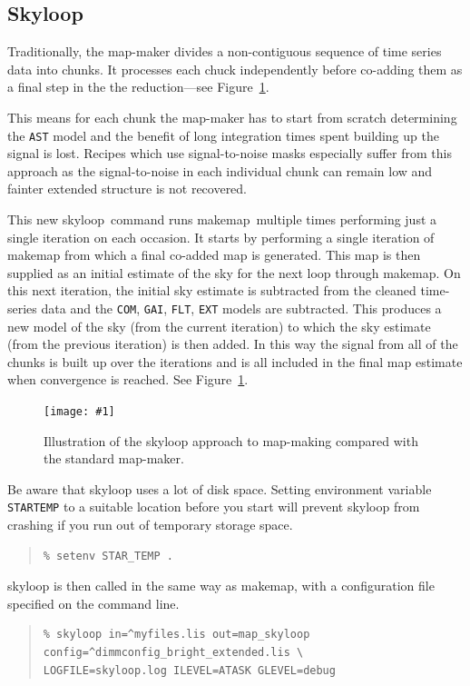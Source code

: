 \documentclass[twoside,11pt]{article}
\newcommand{\htmladdimg}[1]{}
\newcommand{\htmlref}[2]{#1}
\newcommand{\latexhtml}[2]{#1}
\newcommand{\xref}[3]{#1}
\newcommand{\xlabel}[1]{}
\renewcommand{\_}{\texttt{\symbol{95}}}
\newenvironment{myquote}{
   \color{MidnightBlue}\begin{quote}\begin{small}}{
   \end{small}\end{quote}
}
\newcommand{\task}[1]{\textsf{#1}}
\newcommand{\envvar}[1]{\texttt{#1}}
\newcommand{\model}[1]{\texttt{#1}}
\newcommand{\makemap}{\xref{\task{makemap}}{sun258}{MAKEMAP}}
\newcommand{\skyloop}{\xref{\task{skyloop}}{sun258}{SKYLOOP}}
\newcommand{\myfig}[6]{
  \begin{figure}#2
    \centering\texttt{[image: \#1]}
    \typeout{#1 inserted on page \arabic{page}}
    \caption[#5]{\label{#4}\small #6}
  \end{figure}
}
\newcommand{\myfig}[6]{
    \label{#4} \htmladdimg{#1.png}\\
    \\
    Figure: #6\\
  }
\newcommand{\cref}[3]{\latexhtml{#1~\ref{#2}}{\htmlref{#3}{#2}}}
\renewenvironment{myquote}{
      \begin{quote}\begin{small}}{
      \end{small}\end{quote}
   }
\begin{document}
\subsection{\xlabel{skyloop}Skyloop}
\label{sec:skyloop}

Traditionally, the map-maker divides a non-contiguous sequence of time
series data into chunks. It processes each chuck independently
before co-adding them as a final step in the the reduction---see
\cref{Figure}{fig:skyloop}{the figure below}.

This means for each chunk the map-maker has to start from scratch
determining the \model{AST} model and the benefit of long integration
times spent building up the signal is lost. Recipes which use
signal-to-noise masks especially suffer from this approach as the
signal-to-noise in each individual chunk can remain low and fainter
extended structure is not recovered.

This new \skyloop\ command runs \makemap\ multiple times
performing just a single iteration on each occasion. It starts by
performing a single iteration of \task{makemap} from which a final
co-added map is generated. This map is then supplied as an initial
estimate of the sky for the next loop through \task{makemap}. On
this next iteration, the initial sky estimate is subtracted from the
cleaned time-series data and the \model{COM}, \model{GAI},
\model{FLT}, \model{EXT} models are subtracted. This produces a new
model of the sky (from the current iteration) to which the sky
estimate (from the previous iteration) is then added. In this way the
signal from all of the chunks is built up over the iterations and is
all included in the final map estimate when convergence is reached.
See \cref{Figure}{fig:skyloop}{the diagram below}.


\myfig{sc21_skyloop}{[h!]}{width=0.55\linewidth}{fig:skyloop}{
  Illustration of the \task{skyloop} approach}{
  Illustration of the \task{skyloop} approach
  to map-making compared with the standard map-maker.
}

Be aware that \task{skyloop} uses a lot of disk space. Setting
environment variable \envvar{STAR\_TEMP} to a suitable location
before you start will prevent \task{skyloop} from crashing
if you run out of temporary storage space.
\begin{myquote}
\begin{verbatim}
% setenv STAR_TEMP .
\end{verbatim}
\end{myquote}
\task{skyloop} is then called in the same way as \makemap, with
 a configuration file specified on the command line.
\begin{myquote}
\begin{verbatim}
% skyloop in=^myfiles.lis out=map_skyloop config=^dimmconfig_bright_extended.lis \
LOGFILE=skyloop.log ILEVEL=ATASK GLEVEL=debug
\end{verbatim}
\end{myquote}
\end{document}
